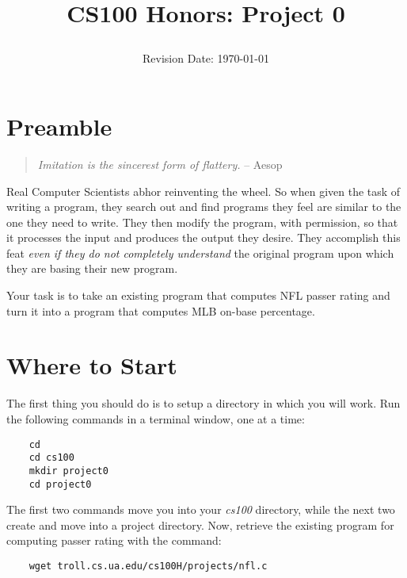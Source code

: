 \documentclass[12pt]{article}
\title{CS100 Honors: Project 0\\
\date{Revision Date: \today}}
\begin{document}
\maketitle

\thispagestyle{empty}

\W\subsubsection*{}
\W\htmlrule


\section*{Preamble}

\begin{quote}
{\it Imitation is the sincerest form of flattery.}
-- Aesop
\end{quote}

Real Computer Scientists abhor reinventing the wheel. 
So when given the task of writing a program, they search out and find programs
they feel are similar to the one they need to write.
They then modify the program, with permission,
so that it processes the input and
produces the output
they desire.
They accomplish this feat {\it even if they do not completely understand}
the original program upon which they are basing their new program.

Your task is to take an existing program that computes
NFL passer rating
and turn it into a program that computes
MLB on-base percentage.

\section*{Where to Start}

The first thing you should do is to setup a directory in which you will work.
Run the following commands in a terminal window, one at a time:

\begin{verbatim}
    cd
    cd cs100
    mkdir project0
    cd project0
\end{verbatim}

The first two commands move you into your {\it cs100} directory, while the next
two create and move into a project directory.
Now, 
retrieve the existing program for computing passer rating
with the command:

\begin{verbatim}
    wget troll.cs.ua.edu/cs100H/projects/nfl.c
\end{verbatim}
\end{document}
